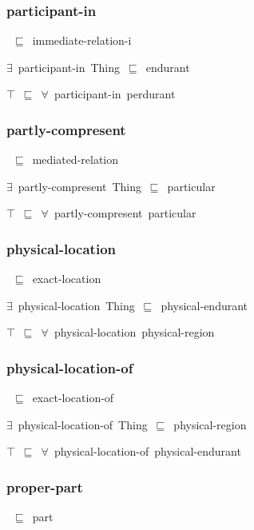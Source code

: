 \documentclass{article}
\begin{document}
\subsubsection*{participant-in}

~\ensuremath{\sqsubseteq}~immediate-relation-i

\ensuremath{\exists}~participant-in~Thing~\ensuremath{\sqsubseteq}~endurant

\ensuremath{\top}~\ensuremath{\sqsubseteq}~\ensuremath{\forall}~participant-in~perdurant

\subsubsection*{partly-compresent}

~\ensuremath{\sqsubseteq}~mediated-relation

\ensuremath{\exists}~partly-compresent~Thing~\ensuremath{\sqsubseteq}~particular

\ensuremath{\top}~\ensuremath{\sqsubseteq}~\ensuremath{\forall}~partly-compresent~particular

\subsubsection*{physical-location}

~\ensuremath{\sqsubseteq}~exact-location

\ensuremath{\exists}~physical-location~Thing~\ensuremath{\sqsubseteq}~physical-endurant

\ensuremath{\top}~\ensuremath{\sqsubseteq}~\ensuremath{\forall}~physical-location~physical-region

\subsubsection*{physical-location-of}

~\ensuremath{\sqsubseteq}~exact-location-of

\ensuremath{\exists}~physical-location-of~Thing~\ensuremath{\sqsubseteq}~physical-region

\ensuremath{\top}~\ensuremath{\sqsubseteq}~\ensuremath{\forall}~physical-location-of~physical-endurant

\subsubsection*{proper-part}

~\ensuremath{\sqsubseteq}~part
\end{document}

